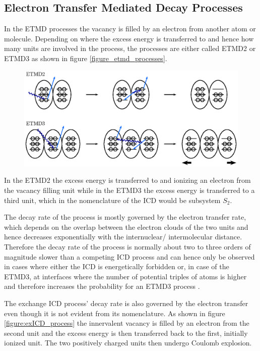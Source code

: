 \subsection{Electron Transfer Mediated Decay Processes}
In the \ac{ETMD} processes the vacancy is filled by an electron from another
atom or molecule. Depending on where the excess energy is transferred to and
hence how many units are involved in the process, the processes are either called
ETMD2 or ETMD3 as shown in figure \ref{figure_etmd_processes}.

\begin{figure}[h]
 \centering
 \includegraphics{pics/etmd-pspic.eps}
 \caption{}
 \label{figure:etmd_processes}
\end{figure}

In the ETMD2 the excess energy is transferred to and ionizing an electron
from the vacancy filling unit while in the ETMD3 the excess energy is transferred
to a third unit, which in the nomenclature of the ICD would be subsystem $S_2$.

The decay rate of the process is mostly governed by the electron transfer rate, which
depends on the overlap between the electron clouds of the two units and hence
decreases exponentially with the internuclear/ intermolecular distance. Therefore
the decay rate of the process is normally about two to three orders of magnitude slower
than a competing ICD process and can hence only be observed in cases where either
the ICD is energetically forbidden or, in case of the ETMD3, at interfaces
where the number of potential
triples of atoms is higher and therefore increases the probability for an ETMD3 process
\cite{Fasshauer13}.

The exchange ICD process' decay rate is also governed by the electron transfer
even though it is not evident from its nomenclature. As shown in
figure \ref{figure:exICD_process} the innervalent vacancy is filled by an electron
from the second unit and the excess energy is then transferred back to the first,
initially ionized unit. The two positively charged units then undergo Coulomb
explosion.

